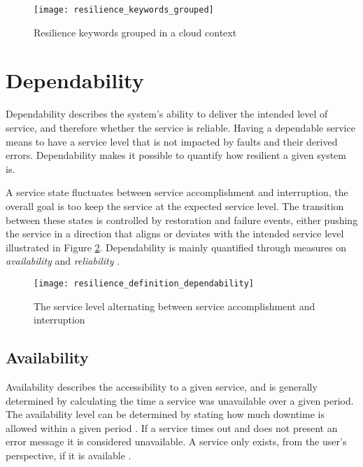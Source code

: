 \begin{figure}[!htb]
\begin{center}
  \texttt{[image: resilience\_keywords\_grouped]}  
  \caption{Resilience keywords grouped in a cloud context}
  \label{fig:resilience_keywords_grouped}
 \end{center}
\end{figure}


\section{Dependability}
Dependability describes the system's ability to deliver the intended level of service, and therefore whether the service is reliable. Having a dependable service means to have a service level that is not impacted by faults and their derived errors. Dependability makes it possible to quantify how resilient a given system is.

A service state fluctuates between service accomplishment and interruption, the overall goal is too keep the service at the expected service level. The transition between these states is controlled by restoration and failure events, either pushing the service in a direction that aligns or deviates with the intended service level illustrated in Figure \ref{fig:resilience_definition_dependability}. Dependability is mainly quantified through measures on \textit{availability} and \textit{reliability} \cite{laprie1985dependable}.

\begin{figure}[!htb]
  \texttt{[image: resilience\_definition\_dependability]}  
  \caption{The service level alternating between service accomplishment and interruption}
  \label{fig:resilience_definition_dependability}
\end{figure}


\subsection{Availability}
Availability describes the accessibility to a given service, and is generally determined by calculating the time a service was unavailable over a given period. The availability level can be determined by stating how much downtime is allowed within a given period \cite[p. 477]{beyer2016siteReliabilityEngineering}. If a service times out and does not present an error message it is considered unavailable. A service only exists, from the user's perspective, if it is available \cite[p. 345]{beyer2016siteReliabilityEngineering}. 

